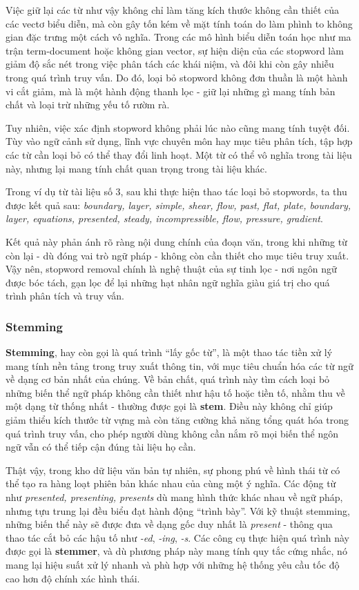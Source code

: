 Việc giữ lại các từ như vậy không chỉ làm tăng kích thước không cần thiết của các vectơ biểu diễn, mà còn gây tốn kém về mặt tính toán do làm phình to không gian đặc trưng một cách vô nghĩa. Trong các mô hình biểu diễn toán học như ma trận term-document hoặc không gian vector, sự hiện diện của các stopword làm giảm độ sắc nét trong việc phân tách các khái niệm, và đôi khi còn gây nhiễu trong quá trình truy vấn. Do đó, loại bỏ stopword không đơn thuần là một hành vi cắt giảm, mà là một hành động thanh lọc - giữ lại những gì mang tính bản chất và loại trừ những yếu tố rườm rà.

Tuy nhiên, việc xác định stopword không phải lúc nào cũng mang tính tuyệt đối. Tùy vào ngữ cảnh sử dụng, lĩnh vực chuyên môn hay mục tiêu phân tích, tập hợp các từ cần loại bỏ có thể thay đổi linh hoạt. Một từ có thể vô nghĩa trong tài liệu này, nhưng lại mang tính chất quan trọng trong tài liệu khác.

Trong ví dụ từ tài liệu số 3, sau khi thực hiện thao tác loại bỏ stopwords, ta thu được kết quả sau:
\textit{boundary, layer, simple, shear, flow, past, flat, plate, boundary, layer, equations, presented, steady, incompressible, flow, pressure, gradient}.

Kết quả này phản ánh rõ ràng nội dung chính của đoạn văn, trong khi những từ còn lại - dù đóng vai trò ngữ pháp - không còn cần thiết cho mục tiêu truy xuất. Vậy nên, stopword removal chính là nghệ thuật của sự tinh lọc - nơi ngôn ngữ được bóc tách, gạn lọc để lại những hạt nhân ngữ nghĩa giàu giá trị cho quá trình phân tích và truy vấn.

\subsubsection{Stemming}
\textbf{Stemming}, hay còn gọi là quá trình ``lấy gốc từ'', là một thao tác tiền xử lý mang tính nền tảng trong truy xuất thông tin, với mục tiêu chuẩn hóa các từ ngữ về dạng cơ bản nhất của chúng. Về bản chất, quá trình này tìm cách loại bỏ những biến thể ngữ pháp không cần thiết như hậu tố hoặc tiền tố, nhằm thu về một dạng từ thống nhất - thường được gọi là \textbf{stem}. Điều này không chỉ giúp giảm thiểu kích thước từ vựng mà còn tăng cường khả năng tổng quát hóa trong quá trình truy vấn, cho phép người dùng không cần nắm rõ mọi biến thể ngôn ngữ vẫn có thể tiếp cận đúng tài liệu họ cần.

Thật vậy, trong kho dữ liệu văn bản tự nhiên, sự phong phú về hình thái từ có thể tạo ra hàng loạt phiên bản khác nhau của cùng một ý nghĩa. Các động từ như \textit{presented, presenting, presents} dù mang hình thức khác nhau về ngữ pháp, nhưng tựu trung lại đều biểu đạt hành động ``trình bày''. Với kỹ thuật stemming, những biến thể này sẽ được đưa về dạng gốc duy nhất là \textit{present} - thông qua thao tác cắt bỏ các hậu tố như \textit{-ed}, \textit{-ing}, \textit{-s}. Các công cụ thực hiện quá trình này được gọi là \textbf{stemmer}, và dù phương pháp này mang tính quy tắc cứng nhắc, nó mang lại hiệu suất xử lý nhanh và phù hợp với những hệ thống yêu cầu tốc độ cao hơn độ chính xác hình thái.

